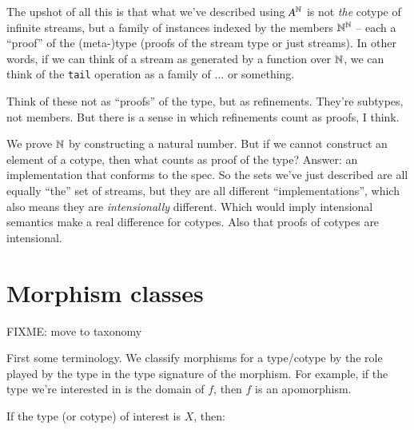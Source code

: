 The upshot of all this is that what we've described using
\(A^{\mathbb{N}}\) is not \textit{the} cotype of infinite streams, but
a family of instances indexed by the members \(\mathbb{N}^{\mathbb{N}}\) --
each a ``proof'' of the (meta-)type (proofs of the stream type or just
streams). In other words, if we can think of a stream as generated by
a function over \(\mathbb{N}\), we can think of the \texttt{tail} operation
as a family of ... or something.

Think of these not as ``proofs'' of the type, but as refinements.
They're subtypes, not members. But there is a sense in which
refinements count as proofs, I think.

We prove \(\mathbb{N}\) by constructing a natural number. But if we cannot
construct an element of a cotype, then what counts as proof of the
type? Answer: an implementation that conforms to the spec. So the sets
we've just described are all equally ``the'' set of streams, but they
are all different ``implementations'', which also means they are
\textit{intensionally} different. Which would imply intensional
semantics make a real difference for cotypes. Also that proofs of
cotypes are intensional.

\section{Morphism classes}\label{morph:classes}

FIXME: move to taxonomy

First some terminology. We classify morphisms for a type/cotype by the
role played by the type in the type signature of the morphism. For
example, if the type we're interested in is the domain of \(f\), then
\(f\) is an apomorphism.

If the type (or cotype) of interest is \(X\), then:

